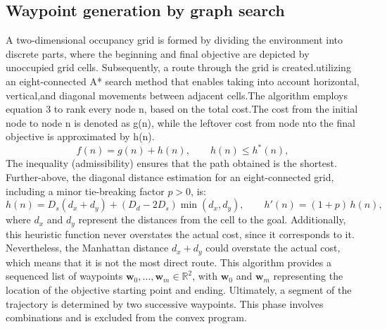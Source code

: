 \subsection{Waypoint generation by graph search}
\label{sec:astar}
A two-dimensional occupancy grid is formed by dividing the environment into discrete parts, where the beginning and final objective are depicted by unoccupied grid cells. Subsequently, a route through the grid is created.utilizing an eight-connected A* search method that enables taking into account horizontal, vertical,and diagonal movements between adjacent cells.The algorithm employs equation 3 to rank every node n, based on the total cost.The cost from the initial node to node n is denoted as g(n), while the leftover cost from node nto the final objective is approximated by h(n).
\begin{equation}
f(n) = g(n) + h(n), \qquad h(n) \le h^*(n),
\label{eq:astar}
\end{equation}
The inequality (admissibility) ensures that the path obtained is the shortest. Further-above, the diagonal distance estimation for an eight-connected grid, including a minor tie-breaking factor $p > 0$, is:
\begin{equation}
h(n) = D_s(d_x+d_y) + (D_d-2D_s)\min(d_x,d_y), \qquad h'(n) = (1+p)\,h(n),
\label{eq:heuristic}
\end{equation}
where $d_x$ and $d_y$ represent the distances from the cell to the goal. Additionally, this heuristic function never overstates the actual cost, since it corresponds to it. Nevertheless, the Manhattan distance $d_x+d_y$ could overstate the actual cost, which means that it is not the most direct route. This algorithm provides a sequenced list of waypoints
$\mathbf{w}_0,\ldots,\mathbf{w}_m \in \mathbb{R}^2$, with $\mathbf{w}_0$ and $\mathbf{w}_m$ representing the location of the objective starting point and ending. Ultimately, a segment of the trajectory is determined by two successive waypoints. This phase involves combinations and is excluded from the convex program.


